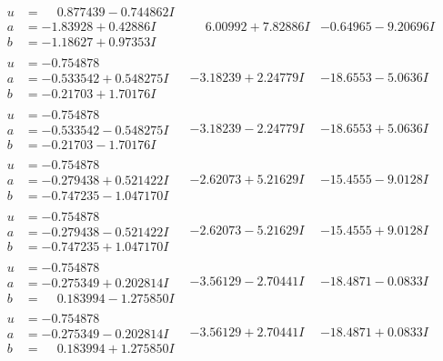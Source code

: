\documentclass[1p]{elsarticle_modified}
\theoremstyle{definition}
\begin{document}
$$\begin{array}{c|c|c}
\begin{aligned}
u &= \phantom{-}0.877439 - 0.744862 I \\
a &= -1.83928 + 0.42886 I \\
b &= -1.18627 + 0.97353 I\end{aligned}
 & \phantom{-}6.00992 + 7.82886 I & -0.64965 - 9.20696 I \\ \hline\begin{aligned}
u &= -0.754878\phantom{ +0.000000I} \\
a &= -0.533542 + 0.548275 I \\
b &= -0.21703 + 1.70176 I\end{aligned}
 & -3.18239 + 2.24779 I & -18.6553 - 5.0636 I \\ \hline\begin{aligned}
u &= -0.754878\phantom{ +0.000000I} \\
a &= -0.533542 - 0.548275 I \\
b &= -0.21703 - 1.70176 I\end{aligned}
 & -3.18239 - 2.24779 I & -18.6553 + 5.0636 I \\ \hline\begin{aligned}
u &= -0.754878\phantom{ +0.000000I} \\
a &= -0.279438 + 0.521422 I \\
b &= -0.747235 - 1.047170 I\end{aligned}
 & -2.62073 + 5.21629 I & -15.4555 - 9.0128 I \\ \hline\begin{aligned}
u &= -0.754878\phantom{ +0.000000I} \\
a &= -0.279438 - 0.521422 I \\
b &= -0.747235 + 1.047170 I\end{aligned}
 & -2.62073 - 5.21629 I & -15.4555 + 9.0128 I \\ \hline\begin{aligned}
u &= -0.754878\phantom{ +0.000000I} \\
a &= -0.275349 + 0.202814 I \\
b &= \phantom{-}0.183994 - 1.275850 I\end{aligned}
 & -3.56129 - 2.70441 I & -18.4871 - 0.0833 I \\ \hline\begin{aligned}
u &= -0.754878\phantom{ +0.000000I} \\
a &= -0.275349 - 0.202814 I \\
b &= \phantom{-}0.183994 + 1.275850 I\end{aligned}
 & -3.56129 + 2.70441 I & -18.4871 + 0.0833 I\\

\end{array}$$
\end{document}
